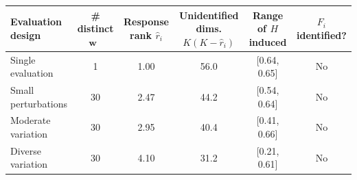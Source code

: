 \begin{tabular}{lccccc}
\toprule
Evaluation design & \# distinct $\mathbf{w}$\ & Response rank $\hat r_i$ & Unidentified dims. $K(K-\hat r_i)$ & Range of $H$ induced & $F_i$ identified? \\
\midrule
Single evaluation & 1 & 1.00 & 56.0 & [0.64, 0.65] & No \\
Small perturbations & 30 & 2.47 & 44.2 & [0.54, 0.64] & No \\
Moderate variation & 30 & 2.95 & 40.4 & [0.41, 0.66] & No \\
Diverse variation & 30 & 4.10 & 31.2 & [0.21, 0.61] & No \\
\bottomrule
\end{tabular}
